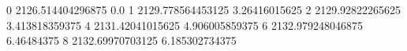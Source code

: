 0 2126.514404296875 0.0
1 2129.778564453125 3.26416015625
2 2129.92822265625 3.413818359375
4 2131.42041015625 4.906005859375
6 2132.979248046875 6.46484375
8 2132.69970703125 6.185302734375
